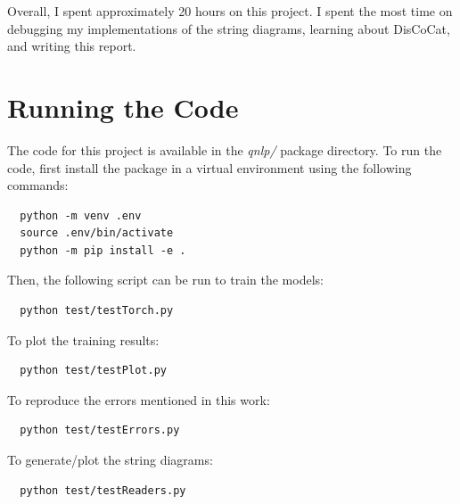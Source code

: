 \documentclass[12pt ]{article}
\begin{document}
Overall, I spent approximately 20 hours on this project. I spent the most time on debugging my implementations of the string diagrams, learning about DisCoCat, and writing this report.

\section{Running the Code}
The code for this project is available in the {\it qnlp/} package directory. To run the code, first install the package in a virtual environment using the following commands: 
\begin{verbatim}
  python -m venv .env 
  source .env/bin/activate
  python -m pip install -e .
\end{verbatim}

Then, the following script can be run to train the models: 

\begin{verbatim}
  python test/testTorch.py
\end{verbatim}

To plot the training results:
\begin{verbatim}
  python test/testPlot.py
\end{verbatim}

To reproduce the errors mentioned in this work:
\begin{verbatim}
  python test/testErrors.py
\end{verbatim}

To generate/plot the string diagrams:
\begin{verbatim}
  python test/testReaders.py
\end{verbatim}
\end{document}
